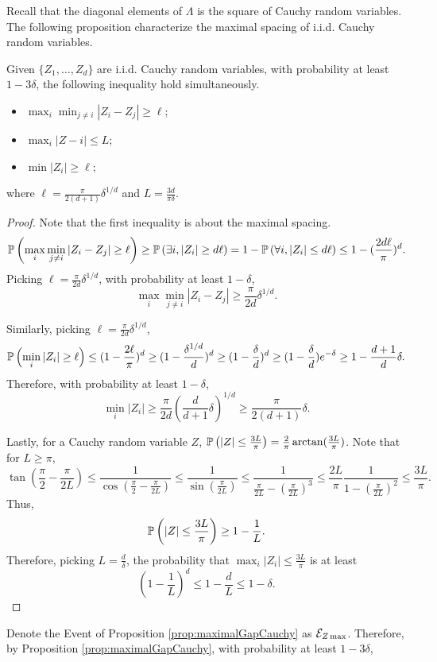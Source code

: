 Recall that the diagonal elements of $\Lambda$ is the square of Cauchy random variables. The following proposition characterize the maximal spacing of i.i.d. Cauchy random variables.
\begin{prop}
\label{prop:maximalGapCauchy}
Given $\{Z_1,\ldots, Z_d\}$ are i.i.d. Cauchy random variables, with probability at least $1-3\delta$, the following inequality hold simultaneously.
\begin{itemize}
\item $\max_i\min_{j\neq i} | Z_i - Z_j| \ge \ell$;
\item $ \max_i |Z-i| \le L$;
\item $\min |Z_i| \ge \ell$;
\end{itemize} 
where $\ell = \frac{\pi}{2(d+1)}\delta^{1/d}$ and $ L = \frac{3d}{\pi\delta}$.
\end{prop}
\begin{proof}
Note that the first inequality is about the maximal spacing.
\[
\mathbb{P}\left(\max_i\min_{j\neq i} | Z_i - Z_j| \ge \ell\right) \ge \mathbb{P}\left(\exists i, |Z_i| \ge d\ell\right) = 1-\mathbb{P}\left(\forall i, |Z_i| \le d\ell\right) \le 1- (\frac{2d\ell}{\pi})^d.
\]
Picking $\ell = \frac{\pi}{2d}\delta^{1/d}$, with probability at least $1-\delta$, 
\[
\max_i\min_{j\neq i} | Z_i - Z_j| \ge \frac{\pi}{2d}\delta^{1/d}.
\]

Similarly, picking $\ell = \frac{\pi}{2d}\delta^{1/d}$,
\[
\mathbb{P}\left(\min_i |Z_i| \ge \ell\right) \le (1- \frac{2\ell}{\pi})^d \ge (1-\frac{\delta^{1/d}}{d})^d \ge (1-\frac{\delta}{d})^d \ge (1-\frac{\delta}{d})e^{-\delta} \ge 1-\frac{d+1}{d}\delta.
\]
Therefore, with probability at least $1-\delta$, 
\[
\min_i |Z_i| \ge \frac{\pi}{2d}(\frac{d}{d+1}\delta)^{1/d}\ge \frac{\pi}{2(d+1)}\delta. 
\]

Lastly, for a Cauchy random variable $Z$, $\mathbb{P}\left(|Z|\le \frac{3L}{\pi}\right)  = \frac{2}{\pi}\arctan(\frac{3L}{\pi})$.
Note that for $L\ge \pi$,
\[
\tan(\frac{\pi}{2} - \frac{\pi}{2L}) \le \frac{1}{\cos (\frac{\pi}{2} - \frac{\pi}{2L})} \le \frac{1}{\sin(\frac{\pi}{2L})}\le \frac{1}{\frac{\pi}{2L} - \left( \frac{\pi}{2L}\right)^3}\le \frac{2L}{\pi} \frac{1}{1 - \left(\frac{\pi}{2L}\right)^2} \le \frac{3L}{\pi}.
\]
Thus, 
\[
\mathbb{P}\left(|Z|\le \frac{3L}{\pi}\right)  \ge 1 - \frac{1}{L}.
\]
Therefore, picking $L = \frac{d}{\delta}$, the probability that $\max_i |Z_i| \le \frac{3L}{\pi}$ is at least 
\[
\left(1-\frac{1}{L}\right)^d \le 1-\frac{d}{L} \le 1-\delta.
\]
\end{proof}
Denote the Event of Proposition \ref{prop:maximalGapCauchy} as $\mathcal{E}_{Z\max}$.
Therefore, by Proposition \ref{prop:maximalGapCauchy}, with probability at least $1-3\delta$, 
